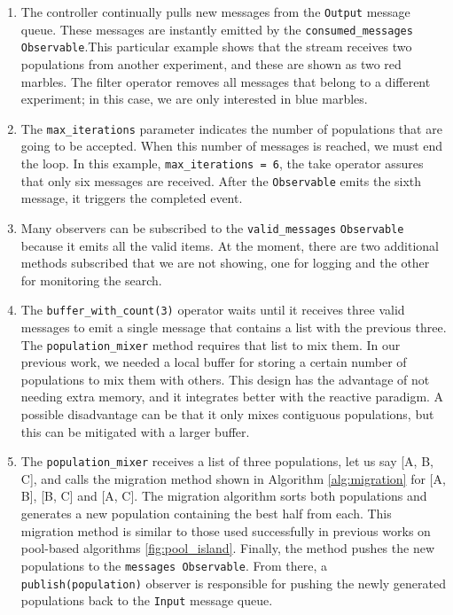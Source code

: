 \documentclass[review]{elsarticle}
\begin{document}
\begin{enumerate}
\item The controller continually pulls new messages from the \texttt{Output} 
message queue. These messages are instantly emitted by the  \texttt{consumed\_messages}
\texttt{Observable}.This particular example shows that the stream receives 
two populations from another experiment, and these are shown as two red marbles.  
The filter operator removes all messages that belong to a different experiment; 
in this case, we are only interested in blue marbles. 

\item The \texttt{max\_iterations} parameter indicates the number of populations that
are going to be accepted. When this number of messages is reached, we must
end the loop. In this example, \texttt{max\_iterations = 6},  the take operator 
assures that only six messages are received. After the \texttt{Observable} emits 
the sixth message, it triggers the completed event.

\item Many observers can be subscribed to the \texttt{valid\_messages} \texttt{Observable} because it
emits all the valid items. At the moment, there are two additional methods
subscribed that we are not showing, one for logging and the other for monitoring
the search.

\item The \texttt{buffer\_with\_count(3)} operator waits until it receives 
three valid messages to emit a single message that contains a list with
the previous three. The \texttt{population\_mixer}  method requires that list to mix them. 
In our previous work, we needed a local buffer for storing a certain 
number of populations to mix them with others. This design has the advantage
of not needing extra memory, and it integrates better with the reactive paradigm.
A possible disadvantage can be that it only mixes contiguous populations,
but this can be mitigated with a larger buffer.

\item The \texttt{population\_mixer} receives a list of three populations,
let us say [A, B, C], and calls the migration method shown in
Algorithm \ref{alg:migration}  for [A, B], [B, C] and [A, C]. 
The migration algorithm sorts both populations and generates
a new population containing the best half from each.
This migration method is similar to those used successfully in previous 
works on pool-based algorithms \ref{fig:pool_island}.  
Finally, the method pushes the new populations to the 
\texttt{messages Observable}. From there, a
\texttt{publish(population)} observer is responsible for pushing
the newly generated populations back to the \texttt{Input} message queue.
\end{enumerate}
\end{document}
